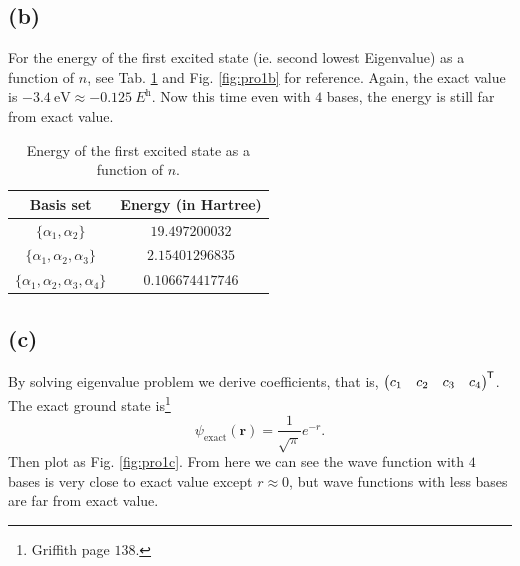 \documentclass[12pt]{article}
\newcommand*{\tran}{^{\mkern-1.5mu\mathsf{T}}}
\begin{document}
\subsection*{(b)}

For the energy of the first excited state (ie. second lowest Eigenvalue)
as a function of $n$, see Tab. \ref{tab:1-b} and Fig. \ref{fig:pro1b} for reference. Again, the exact value
is $\SI{-3.4}{\electronvolt} \approx \SI{-0.125}{\hartree}$. Now this time even with $4$ bases,
the energy is still far from exact value.
\begin{table}[h]
    \centering
    \caption{Energy of the first excited state as a function of $n$.}
    \begin{tabular}{|c|c|}
        \hline
        Basis set                                     & Energy (in Hartree) \\
        \hline
        $\{ \alpha_1, \alpha_2\}$                     & $19.497200032$      \\
        \hline
        $\{ \alpha_1, \alpha_2, \alpha_3\}$           & $2.15401296835$     \\
        \hline
        $\{ \alpha_1, \alpha_2, \alpha_3, \alpha_4\}$ & $0.106674417746$    \\
        \hline
    \end{tabular}
    \label{tab:1-b}
\end{table}


\subsection*{(c)}

By solving eigenvalue problem we derive coefficients, that is,
$\begin{pmatrix}
        c_1 & c_2 & c_3 & c_4
    \end{pmatrix}\tran$. The exact ground state is\footnote{Griffith page $138$.}
\begin{equation}
    \psi_{\text{exact}}(\symbf{r}) = \frac{1}{\sqrt{\pi}} e^{-r}.  %
\end{equation}
Then plot as Fig. \ref{fig:pro1c}.
From here we can see the wave function with $4$ bases is very close to exact value except $r \approx 0$, but
wave functions with less bases are far from exact value.
\end{document}
